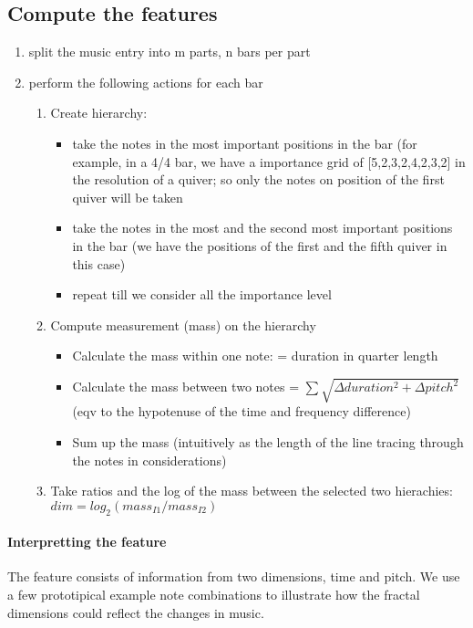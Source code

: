 \documentclass[acmsmall,review,anonymous]{acmart}\settopmatter{printfolios=true,printccs=false,printacmref=false}
\begin{document}
 \subsection{Compute the features}
 \begin{enumerate}
 \item split the music entry into m parts, n bars per part
 
 \item perform the following actions for each bar

   \begin{enumerate}
   \item  Create hierarchy:
     \begin{itemize}
     \item  take the notes in the most important positions in the bar (for example,
      in a 4/4 bar, we have a importance grid of [5,2,3,2,4,2,3,2] in the
      resolution of a quiver; so only the notes on position of the first quiver
      will be taken
      \item take the notes in the most and the second most important positions in
      the bar (we have the positions of the first and the fifth quiver in this
      case)
      \item  repeat till we consider all the importance level
      \end{itemize}
    \item Compute measurement (mass) on the hierarchy
      
      \begin{itemize}
      \item  Calculate the mass within one note: = duration in quarter length
      \item  Calculate the mass between two notes =  $\sum \sqrt{\Delta duration^2 +
        \Delta pitch^2}$ (eqv to the hypotenuse of the time and frequency
      difference)
      \item Sum up the mass (intuitively as the length of the line tracing through
      the notes in considerations)

      \end{itemize}
   \item  Take ratios and the log of the mass between the selected two hierachies: $dim = log_2(mass_{I1}/mass_{I2}) $

   \end{enumerate}
 
     
 \end{enumerate}
 
\paragraph{Interpretting the feature}
The feature consists of information from two dimensions, time and pitch. We use
a few prototipical example note combinations to illustrate how the fractal
dimensions could reflect the changes in music.
\end{document}
